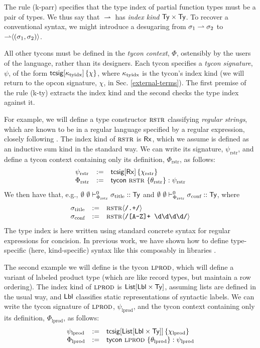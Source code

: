 \documentclass{llncs}
\newcommand{\rulename}[1]{(#1)}
\begin{document}
The rule \rulename{k-parr} specifies that the type index of partial function types must be a pair of types. We thus say that $\rightharpoonup$ has \emph{index kind} ${\sf Ty} \times {\sf Ty}$. To recover a conventional syntax, we might introduce a desugaring from $\sigma_1 \rightharpoonup \sigma_2$ to ${\rightharpoonup}\langle(\sigma_1, \sigma_2)\rangle$. %


All other tycons must be defined in the \emph{tycon context}, $\Phi$, ostensibly by the users of the language, rather than its designers. Each tycon specifies a \emph{tycon signature}, $\psi$, of the form ${\sf tcsig}[\kappa_\text{tyidx}]\,\{\chi\}$, where $\kappa_\text{tyidx}$ is the tycon's index kind (we will return to the opcon signature, $\chi$, in Sec. \ref{external-terms}). The first premise of the rule \rulename{k-ty} extracts the index kind and the second checks the type index against it. 

For example, we will define a type constructor $\textsc{rstr}$ classifying \emph{regular strings}, which  are known to be in a regular language specified by a regular expression, closely following \cite{sanitation-psp14}. The index kind of $\textsc{rstr}$ is ${\sf Rx}$, which we assume is defined as an inductive sum kind in the standard way. We can write its signature, $\psi_\text{rstr}$,  and define a tycon context containing only its definition, $\Phi_\text{rstr}$,  as follows:
\[\begin{array}{lcl}
\psi_\text{rstr} & := & {\sf tcsig}[{\sf Rx}]\,\{\chi_\text{rstr}\}\\
\Phi_\text{rstr} & := & {\sf tycon}~\textsc{rstr} ~\{\theta_\text{rstr}\} : \psi_\text{rstr}
\end{array}\]
We then have that, e.g., $\emptyset~\emptyset \vdash_{\Phi_\text{rstr}}^{0} \sigma_\text{title} :: {\sf Ty}$ and $\emptyset~\emptyset \vdash_{\Phi_\text{rstr}}^{0} \sigma_\text{conf} :: {\sf Ty}$, where 
\[
\begin{array}{lcl}
\sigma_\text{title} & := & {\textsc{rstr}}\langle\texttt{/.+/}\rangle\\
\sigma_\text{conf}  & := & {\textsc{rstr}}\langle\texttt{/[A-Z]+ \textbackslash d\textbackslash d\textbackslash d\textbackslash d/}\rangle
\end{array}\]
The type index is here written using standard concrete syntax for regular expressions for concision. In previous work, we have shown how to define type-specific (here, kind-specific) syntax like this composably in libraries \cite{TSLs}. 

The second example we will define is the tycon $\textsc{lprod}$, which will define a variant of labeled product type (which are like record types, but maintain a row  ordering). The index kind of $\textsc{lprod}$ is ${\sf List}[{\sf Lbl} \times {\sf Ty}]$, assuming lists are defined in the usual way, and ${\sf Lbl}$ classifies static representations of syntactic labels. We can write the tycon signature of $\textsc{lprod}$, $\psi_\text{lprod}$,  and the tycon context containing only its definition, $\Phi_\text{lprod}$, as follows:
\[\begin{array}{lcl}
\psi_\text{lprod} & := & {\sf tcsig}[{\sf List}[{\sf Lbl} \times {\sf Ty}]]\,\{\chi_\text{lprod}\}\\
\Phi_\text{lprod}  & := & {\sf tycon}~\textsc{lprod} ~\{\theta_\text{lprod}\} : \psi_\text{lprod}
\end{array}\]
\end{document}
